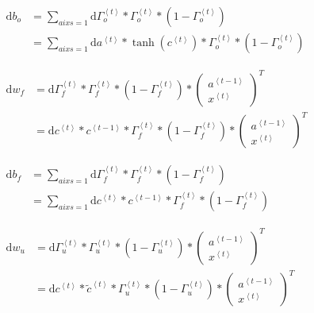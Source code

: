 \documentclass[
]{article}
\begin{document}
\(\begin{aligned}\mathrm{d}b_o &=\sum_{aixs=1}\mathrm{d}\Gamma_{o}^{\left\langle t\right\rangle}*\Gamma_{o}^{\left\langle t\right\rangle}*(1-\Gamma_{o}^{\left\langle t\right\rangle})\\&=\sum_{aixs=1}\mathrm{d}a^{\left\langle t\right\rangle}* \tanh(c^{\left\langle t\right\rangle})*\Gamma_{o}^{\left\langle t\right\rangle}*(1-\Gamma_{o}^{\left\langle t\right\rangle})\end{aligned}\)

\(\begin{aligned}\mathrm{d}w_f&=\mathrm{d}\Gamma_{f}^{\left\langle t\right\rangle}*\Gamma_{f}^{\left\langle t\right\rangle}*(1-\Gamma_{f}^{\left\langle t\right\rangle})*\left(\begin{array} {c}a^{\left \langle t-1\right\rangle} \\x^{\left \langle t\right\rangle}\end{array}\right)^T \\&=\mathrm{d}c^{\left\langle t\right\rangle}*c^{\left\langle t-1\right\rangle}*\Gamma_{f}^{\left\langle t\right\rangle}*(1-\Gamma_{f}^{\left\langle t\right\rangle})*\left(\begin{array} {c}a^{\left \langle t-1\right\rangle} \\x^{\left \langle t\right\rangle}\end{array}\right)^T \end{aligned}\)

\(\begin{aligned}\mathrm{d}b_f &=\sum_{aixs=1}\mathrm{d}\Gamma_{f}^{\left\langle t\right\rangle}*\Gamma_{f}^{\left\langle t\right\rangle}*(1-\Gamma_{f}^{\left\langle t\right\rangle})\\&=\sum_{aixs=1}\mathrm{d}c^{\left\langle t\right\rangle}*c^{\left\langle t-1\right\rangle}*\Gamma_{f}^{\left\langle t\right\rangle}*(1-\Gamma_{f}^{\left\langle t\right\rangle})\end{aligned}\)

\(\begin{aligned}\mathrm{d}w_u &=\mathrm{d}\Gamma_{u}^{\left\langle t\right\rangle}*\Gamma_{u}^{\left\langle t\right\rangle}*(1-\Gamma_{u}^{\left\langle t\right\rangle})* \left(\begin{array} {c}a^{\left \langle t-1\right\rangle} \\x^{\left \langle t\right\rangle}\end{array}\right)^T\\ &=\mathrm{d}c^{\left\langle t\right\rangle}*\tilde{c}^{\left\langle t\right\rangle}*\Gamma_{u}^{\left\langle t\right\rangle}*(1-\Gamma_{u}^{\left\langle t\right\rangle})* \left(\begin{array} {c}a^{\left \langle t-1\right\rangle} \\x^{\left \langle t\right\rangle}\end{array}\right)^T\end{aligned}\)
\end{document}
